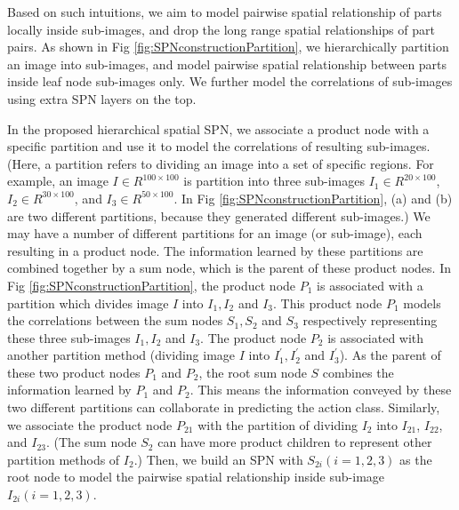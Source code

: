 \documentclass[journal]{IEEEtran}
\begin{document}
Based on such intuitions, we aim to model pairwise spatial relationship of parts locally inside sub-images, and drop the long range spatial relationships of part pairs. As shown in Fig \ref{fig:SPNconstructionPartition}, we hierarchically partition an image into sub-images, and model pairwise spatial relationship between parts inside leaf node sub-images only.  We further model the correlations of sub-images using extra SPN layers on the top.







In the proposed hierarchical spatial SPN, we associate a product node with a specific partition and use it to model the correlations of resulting sub-images. (Here, a partition refers to dividing an image into a set of specific regions. For example, an image $ I \in R^{100\times100} $ is partition into three sub-images $ I_1 \in R^{20 \times100} $, $ I_2 \in R^{30 \times100} $, and $ I_3 \in R^{50 \times100} $. In Fig \ref{fig:SPNconstructionPartition}, (a) and (b) are two different partitions, because they generated different sub-images.) We may have a number of different partitions for an image (or sub-image), each resulting in a product node.
The information learned by these partitions are combined together by a sum node, which is the parent of  these product nodes.
In Fig \ref{fig:SPNconstructionPartition}, the product node $ P_1 $ is associated with a partition which divides image $ I $ into $ I_1, I_2 $ and $ I_3 $. This product node $ P_1 $ models the correlations between the sum nodes $ S_1, S_2$ and $ S_3 $ respectively representing these three sub-images $ I_1, I_2 $ and $ I_3 $. The product node $ P_2 $ is associated with another partition method (dividing image $ I $ into $ I_1^{'}, I_2^{'} $ and $ I_3^{'} $).
As the parent of these two product nodes $ P_1 $ and $ P_2 $, the root sum node $ S $ combines the information learned by $ P_1 $ and $ P_2 $. This means the information conveyed by these two different partitions can collaborate in predicting the action class. Similarly, we associate the product node $ P_{21} $ with the partition of dividing $ I_2 $ into $ I_{21} $, $ I_{22} $, and $ I_{23} $. (The sum node $ S_2 $ can have more product children to represent other partition methods of $ I_2 $.) Then, we build an SPN with $ S_{2i} (i=1,2,3)$ as the root node to model the pairwise spatial relationship inside sub-image $ I_{2i} (i=1,2,3)$.
\end{document}
